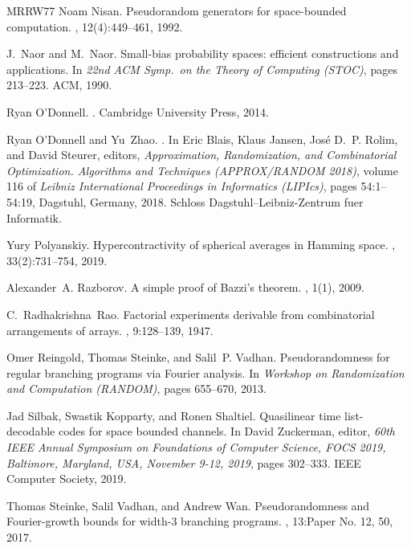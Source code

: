 \documentclass[10pt,a4paper]{article}
\theoremstyle{definition}
\begin{document}
\begin{thebibliography}{MRRW77}
Noam Nisan.
\newblock Pseudorandom generators for space-bounded computation.
, 12(4):449--461, 1992.

J.~Naor and M.~Naor.
\newblock Small-bias probability spaces: efficient constructions and applications.
\newblock In {\em 22nd ACM Symp.~on the Theory of Computing (STOC)}, pages 213--223. ACM, 1990.

Ryan O'Donnell.
.
\newblock Cambridge University Press, 2014.

Ryan O'Donnell and Yu~Zhao.
.
\newblock In Eric Blais, Klaus Jansen, Jos{\'e} D.~P. Rolim, and David Steurer, editors, {\em Approximation, Randomization, and Combinatorial Optimization. Algorithms and Techniques (APPROX/RANDOM 2018)}, volume 116 of {\em Leibniz International Proceedings in Informatics (LIPIcs)}, pages 54:1--54:19, Dagstuhl, Germany, 2018. Schloss Dagstuhl--Leibniz-Zentrum fuer Informatik.

Yury Polyanskiy.
\newblock Hypercontractivity of spherical averages in {H}amming space.
, 33(2):731--754, 2019.

Alexander~A. Razborov.
\newblock A simple proof of {B}azzi's theorem.
, 1(1), 2009.

C.~Radhakrishna~Rao.
\newblock Factorial experiments derivable from combinatorial arrangements of arrays.
, 9:128--139, 1947.

Omer Reingold, Thomas Steinke, and Salil~P. Vadhan.
\newblock Pseudorandomness for regular branching programs via {F}ourier analysis.
\newblock In {\em Workshop on Randomization and Computation (RANDOM)}, pages 655--670, 2013.

Jad Silbak, Swastik Kopparty, and Ronen Shaltiel.
\newblock Quasilinear time list-decodable codes for space bounded channels.
\newblock In David Zuckerman, editor, {\em 60th {IEEE} Annual Symposium on Foundations of Computer Science, {FOCS} 2019, Baltimore, Maryland, USA, November 9-12, 2019}, pages 302--333. {IEEE} Computer Society, 2019.

Thomas Steinke, Salil Vadhan, and Andrew Wan.
\newblock Pseudorandomness and {F}ourier-growth bounds for width-3 branching programs.
, 13:Paper No. 12, 50, 2017.


\end{thebibliography}
\end{document}
